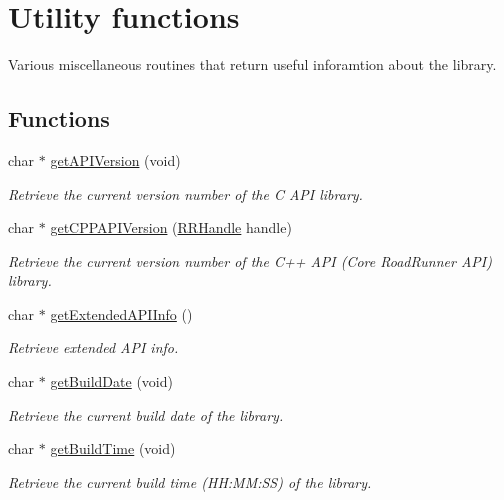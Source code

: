 \hypertarget{group__utility}{\section{Utility functions}
\label{group__utility}
}


Various miscellaneous routines that return useful inforamtion about the library.  


\subsection*{Functions}
\begin{DoxyCompactItemize}
\item 
char $\ast$ \hyperlink{group__utility_ga15926a2382e69eb842d4f74e76fe6572}{get\-A\-P\-I\-Version} (void)
\begin{DoxyCompactList}\small\item\em Retrieve the current version number of the C A\-P\-I library. \end{DoxyCompactList}\item 
char $\ast$ \hyperlink{group__utility_ga54b7e9e1d61787294e15b00ad485ec01}{get\-C\-P\-P\-A\-P\-I\-Version} (\hyperlink{rrc__types_8h_a1d68f0592372208fa5a5f2799ea4b3ae}{R\-R\-Handle} handle)
\begin{DoxyCompactList}\small\item\em Retrieve the current version number of the C++ A\-P\-I (Core Road\-Runner A\-P\-I) library. \end{DoxyCompactList}\item 
char $\ast$ \hyperlink{group__utility_ga4aa3b25a273d9d7c4c1750e51818bd56}{get\-Extended\-A\-P\-I\-Info} ()
\begin{DoxyCompactList}\small\item\em Retrieve extended A\-P\-I info. \end{DoxyCompactList}\item 
char $\ast$ \hyperlink{group__utility_ga3997a57475e6d266df999b8e94f000b1}{get\-Build\-Date} (void)
\begin{DoxyCompactList}\small\item\em Retrieve the current build date of the library. \end{DoxyCompactList}\item 
char $\ast$ \hyperlink{group__utility_ga4e9d3eb8e6659d8c2696a3a81d64d6d8}{get\-Build\-Time} (void)
\begin{DoxyCompactList}\small\item\em Retrieve the current build time (H\-H\-:\-M\-M\-:S\-S) of the library. \end{DoxyCompactList}\item 

\end{DoxyCompactItemize}
